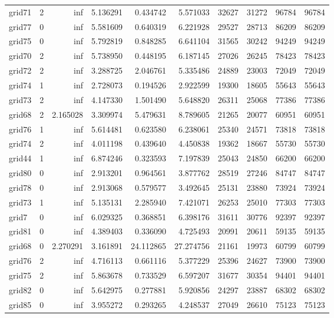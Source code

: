 \begin{longtable}{|l|r|r|r|r|r|r|r|r|r|}
grid71 & 2 & inf & 5.136291 & 0.434742 & 5.571033 & 32627 & 31272 & 96784 & 96784 \\
grid77 & 0 & inf & 5.581609 & 0.640319 & 6.221928 & 29527 & 28713 & 86209 & 86209 \\
grid75 & 0 & inf & 5.792819 & 0.848285 & 6.641104 & 31565 & 30242 & 94249 & 94249 \\
grid70 & 2 & inf & 5.738950 & 0.448195 & 6.187145 & 27026 & 26245 & 78423 & 78423 \\
grid72 & 2 & inf & 3.288725 & 2.046761 & 5.335486 & 24889 & 23003 & 72049 & 72049 \\
grid74 & 1 & inf & 2.728073 & 0.194526 & 2.922599 & 19300 & 18605 & 55643 & 55643 \\
grid73 & 2 & inf & 4.147330 & 1.501490 & 5.648820 & 26311 & 25068 & 77386 & 77386 \\
grid68 & 2 & 2.165028 & 3.309974 & 5.479631 & 8.789605 & 21265 & 20077 & 60951 & 60951 \\
grid76 & 1 & inf & 5.614481 & 0.623580 & 6.238061 & 25340 & 24571 & 73818 & 73818 \\
grid74 & 2 & inf & 4.011198 & 0.439640 & 4.450838 & 19362 & 18667 & 55730 & 55730 \\
grid44 & 1 & inf & 6.874246 & 0.323593 & 7.197839 & 25043 & 24850 & 66200 & 66200 \\
grid80 & 0 & inf & 2.913201 & 0.964561 & 3.877762 & 28519 & 27246 & 84747 & 84747 \\
grid78 & 0 & inf & 2.913068 & 0.579577 & 3.492645 & 25131 & 23880 & 73924 & 73924 \\
grid73 & 1 & inf & 5.135131 & 2.285940 & 7.421071 & 26253 & 25010 & 77303 & 77303 \\
grid7 & 0 & inf & 6.029325 & 0.368851 & 6.398176 & 31611 & 30776 & 92397 & 92397 \\
grid81 & 0 & inf & 4.389403 & 0.336090 & 4.725493 & 20991 & 20611 & 59135 & 59135 \\
grid68 & 0 & 2.270291 & 3.161891 & 24.112865 & 27.274756 & 21161 & 19973 & 60799 & 60799 \\
grid76 & 2 & inf & 4.716113 & 0.661116 & 5.377229 & 25396 & 24627 & 73900 & 73900 \\
grid75 & 2 & inf & 5.863678 & 0.733529 & 6.597207 & 31677 & 30354 & 94401 & 94401 \\
grid82 & 0 & inf & 5.642975 & 0.277881 & 5.920856 & 24297 & 23887 & 68302 & 68302 \\
grid85 & 0 & inf & 3.955272 & 0.293265 & 4.248537 & 27049 & 26610 & 75123 & 75123 \\

\end{longtable}
